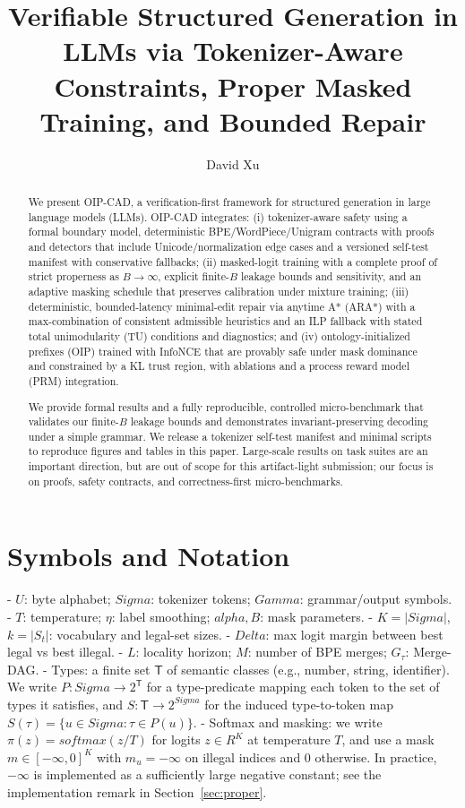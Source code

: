 \documentclass{article}
\title{Verifiable Structured Generation in LLMs via Tokenizer-Aware Constraints, Proper Masked Training, and Bounded Repair}
\author[1]{David Xu}
\affil[1]{China Mobile Research Institute}
\date{}
\def\alpha{alpha}%
\def\Delta{Delta}%
\def\Gamma{Gamma}%
\def\Sigma{Sigma}%
\def\mathcal#1{#1}%
\def\mathrm#1{#1}%
\def\mathbb#1{#1}%
\begin{document}
\maketitle

\begin{abstract}
We present OIP-CAD, a verification-first framework for structured generation in large language models (LLMs). OIP-CAD integrates: (i) tokenizer-aware safety using a formal boundary model, deterministic BPE/WordPiece/Unigram contracts with proofs and detectors that include Unicode/normalization edge cases and a versioned self-test manifest with conservative fallbacks; (ii) masked-logit training with a complete proof of strict properness as $B\to\infty$, explicit finite-$B$ leakage bounds and sensitivity, and an adaptive masking schedule that preserves calibration under mixture training; (iii) deterministic, bounded-latency minimal-edit repair via anytime A* (ARA*) with a max-combination of consistent admissible heuristics and an ILP fallback with stated total unimodularity (TU) conditions and diagnostics; and (iv) ontology-initialized prefixes (OIP) trained with InfoNCE that are provably safe under mask dominance and constrained by a KL trust region, with ablations and a process reward model (PRM) integration.

We provide formal results and a fully reproducible, controlled micro-benchmark that validates our finite-$B$ leakage bounds and demonstrates invariant-preserving decoding under a simple grammar. We release a tokenizer self-test manifest and minimal scripts to reproduce figures and tables in this paper. Large-scale results on task suites are an important direction, but are out of scope for this artifact-light submission; our focus is on proofs, safety contracts, and correctness-first micro-benchmarks.
\end{abstract}


\section*{Symbols and Notation}
- $\mathcal{U}$: byte alphabet; $\Sigma$: tokenizer tokens; $\Gamma$: grammar/output symbols.
- $T$: temperature; $\eta$: label smoothing; $\alpha,B$: mask parameters.
- $K=|\Sigma|$, $k=|\mathcal{S}_t|$: vocabulary and legal-set sizes.
- $\Delta$: max logit margin between best legal vs best illegal.
- $L$: locality horizon; $M$: number of BPE merges; $G_\tau$: Merge-DAG.
- Types: a finite set $\mathsf{T}$ of semantic classes (e.g., number, string, identifier). We write $P:\Sigma\to 2^{\mathsf{T}}$ for a type-predicate mapping each token to the set of types it satisfies, and $S:\mathsf{T}\to 2^{\Sigma}$ for the induced type-to-token map $S(\tau)=\{u\in\Sigma:\tau\in P(u)\}$.
- Softmax and masking: we write $\pi(z)=\mathrm{softmax}(z/T)$ for logits $z\in\mathbb{R}^K$ at temperature $T$, and use a mask $m\in[-\infty,0]^K$ with $m_u=-\infty$ on illegal indices and $0$ otherwise. In practice, $-\infty$ is implemented as a sufficiently large negative constant; see the implementation remark in Section~\ref{sec:proper}.
\end{document}
